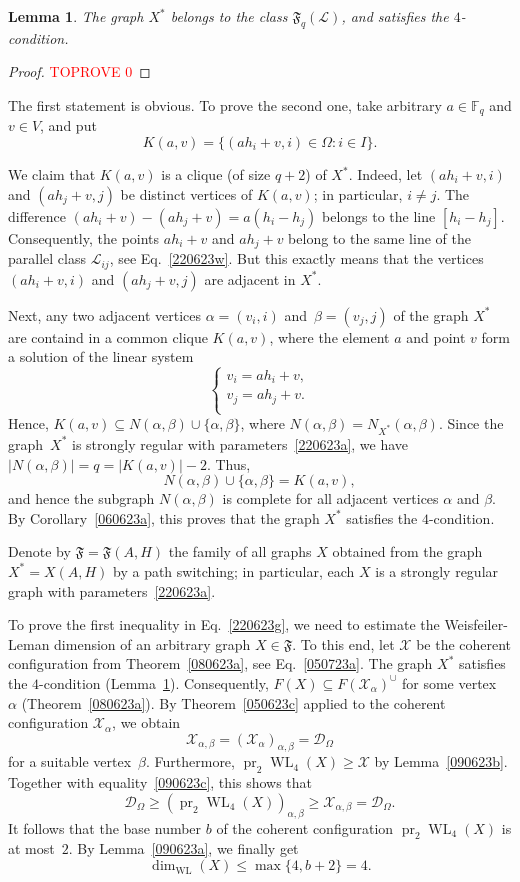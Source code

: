 \documentclass{amsart}
\newcommand{\cal}{\mathcal}
\newtheorem{lemma}[formula]{Lemma}
\def\qtnl#1{\begin{equation}\label{#1}}
\def\eqtn{\end{equation}}
\def\lmml#1{\begin{lemma}\label{#1}}
\def\elmm{\end{lemma}}
\def\prf{\begin{proof}\textcolor{red}{TOPROVE 0}\end{proof}}
\def\cD{{\cal D}}
\def\cL{{\cal L}}
\def\cX{{\cal X}}
\def\mF{{\mathbb F}}
\def\fF{{\mathfrak F}}
\DeclareMathOperator{\pr}{pr}
\DeclareMathOperator{\WL}{WL}
\begin{document}
\lmml{080623j}
The graph $X^*$ belongs to the class $\fF_q(\cL)$, and satisfies the $4$-condition.
\elmm
\prf
The first statement is obvious. To prove the second one, take  arbitrary $a\in \mF_q$ and  $v\in V$, and put
$$
K(a,v)=\{(ah_i+v,i)\in\Omega\colon i\in I\}.
$$

We claim that $K(a,v)$ is a clique (of size $q+2$) of $X^*$. 
Indeed, let $(ah_i+v,i)$ and $(ah_j+v,j)$ be distinct vertices of $K(a,v)$; in particular, $i\ne j$. The difference $(ah_i+v)-(ah_j+v)=a(h_i-h_j)$ belongs to the line $[h_i-h_j]$. 
Consequently, the points $ah_i+v$ and $ah_j+v$ belong to the same  line of the parallel class $\cL_{ij}$, see Eq.~\eqref{220623w}.  But this exactly means that the vertices  $(ah_i+v,i)$ and $(ah_j+v,j)$ are adjacent in $X^*$.

Next, any  two adjacent vertices $\alpha=(v_i,i)$ and~$\beta=(v_j,j)$ of the graph $X^*$ are containd in a common clique $K(a,v)$, where the element $a$ and point $v$ form a solution of the linear system 
$$
\left\{
\begin{aligned}
v_i=ah_i+v,\\
v_j=ah_j+v.\\
\end{aligned}
\right.
$$ 
Hence, $K(a,v)\subseteq N(\alpha,\beta)\cup\{\alpha,\beta\}$, where $N(\alpha,\beta)=N_{X^*}(\alpha,\beta)$. Since the graph~$X^*$ is strongly regular with parameters~\eqref{220623a}, we have $|N(\alpha,\beta) |=q=|K(a,v)|-2$. Thus,
$$
N(\alpha,\beta)\cup\{\alpha,\beta\}=K(a,v),
$$
and hence  the subgraph $N(\alpha,\beta)$ is complete for all adjacent vertices $\alpha$ and $\beta$. By Corollary~\ref{060623a}, this proves that the graph $X^*$ satisfies the $4$-condition.
\eprf

Denote by $\fF=\fF(A,H)$ the family of all graphs $X$ obtained from the graph $X^*=X(A,H)$ by a path switching; in particular, each $X$ is a strongly regular graph with parameters~\eqref {220623a}. 

To prove the first inequality in Eq.~\eqref{220623g}, we need to estimate the Weisfeiler-Leman dimension of an arbitrary graph $X\in\fF$. To this end, let $\cX$  
be the coherent configuration from Theorem~\ref{080623a}, see Eq.~\eqref{050723a}.  The graph $X^*$  satisfies the $4$-condition (Lemma~\ref{080623j}). Consequently, $F(X)\subseteq F(\cX_\alpha)^\cup$  for some vertex~$\alpha$ (Theorem~\ref{080623a}). By Theorem~\ref{050623c} applied to the coherent configuration $\cX_\alpha $, we obtain 
\qtnl{090623c}
\cX_{\alpha,\beta}=(\cX_\alpha)_{\alpha,\beta}=\cD_\Omega
\eqtn
for a suitable vertex~$\beta$. Furthermore, $\pr_2 \WL_4(X)\ge \cX$ 
by Lemma~\ref{090623b}. Together with equality~\eqref{090623c}, 
this shows that
$$
\cD_\Omega\ge (\pr_2 \WL_4(X))_{\alpha,\beta}\ge\cX_{\alpha,\beta}=\cD_\Omega.
$$
It follows that the base number $b$ of the coherent configuration $\pr_2 \WL_4(X)$ is at most~$2$. By Lemma~\ref{090623a}, we finally get 
$$ 
\dim_{\scriptscriptstyle\WL}(X)\le\max\{4,b+2\}=4.
$$
\end{document}
